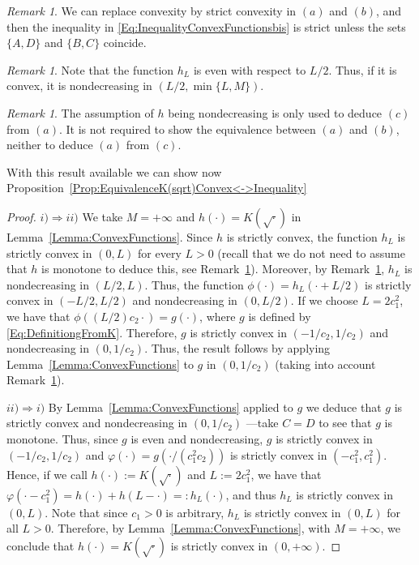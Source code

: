 \documentclass[12pt,reqno]{amsart}
\theoremstyle{definition}
\theoremstyle{remark}
\newtheorem{remark}[theorem]{Remark}
\numberwithin{equation}{section}
\begin{document}
\begin{remark}
	\label{Remark:StrictConvexity}
	We can replace convexity by strict convexity in $(a)$ and $(b)$, and then the inequality in \eqref{Eq:InequalityConvexFunctionsbis} is strict unless the sets $\{A,D\}$ and $\{B,C\}$ coincide.
\end{remark}

\begin{remark}
	\label{Remark:h_Lincreasing}
	Note that the function $h_L$ is even with respect to $L/2$. Thus, if it is convex, it is nondecreasing in $(L/2, \min \{L,M\})$.
\end{remark}

\begin{remark}
	\label{Remark:hypothesisNondecreasing}
	The assumption of $h$ being nondecreasing is only used to deduce $(c)$ from $(a)$. It is not required to show the equivalence between $(a)$ and $(b)$, neither to deduce $(a)$ from $(c)$.
\end{remark}

With this result available we can show now Proposition~\ref{Prop:EquivalenceK(sqrt)Convex<->Inequality}

\begin{proof}
	$i) \Rightarrow ii)$ We take $M = +\infty$ and $h(\cdot) = K(\sqrt{\cdot})$ in Lemma~\ref{Lemma:ConvexFunctions}. Since $h$ is strictly convex, the function $h_L$ is strictly convex in $(0,L)$ for every $L> 0$ (recall that we do not need to assume that $h$ is monotone to deduce this, see Remark~\ref{Remark:hypothesisNondecreasing}). Moreover, by Remark~\ref{Remark:h_Lincreasing}, $h_L$ is nondecreasing in $(L/2,L)$. Thus, the function $\phi(\cdot) = h_L(\cdot + L/2)$ is strictly convex in $(-L/2,L/2)$ and nondecreasing in $(0,L/2)$. If we choose $L=2c_1^2$, we have that $\phi((L/2)c_2 \cdot) = g(\cdot)$, where $g$ is defined by \eqref{Eq:DefinitiongFromK}. Therefore, $g$ is strictly convex in $(-1/c_2, 1/c_2)$ and nondecreasing in $(0,1/c_2)$. Thus, the result follows by applying  Lemma~\ref{Lemma:ConvexFunctions} to $g$ in $(0,1/c_2)$ (taking into account Remark~\ref{Remark:StrictConvexity}).
	
	
	$ii) \Rightarrow i)$ By Lemma~\ref{Lemma:ConvexFunctions} applied to $g$ we deduce that $g$ is strictly convex and nondecreasing in $(0,1/c_2)$ ---take $C=D$ to see that $g$ is monotone. Thus, since $g$ is even and nondecreasing, $g$ is strictly convex in $(-1/c_2,1/c_2)$ and $\varphi(\cdot) = g(\cdot/(c_1^2 c_2))$ is strictly convex in $(-c_1^2, c_1^2)$. Hence, if we call $h(\cdot) := K(\sqrt{\cdot})$ and $L:= 2c_1^2$, we have that $\varphi(\cdot - c_1^2) = h(\cdot) + h(L-\cdot) =:  h_L(\cdot)$, and thus $h_L$ is strictly convex in $(0,L)$. Note that since $c_1>0$ is arbitrary, $h_L$ is strictly convex in $(0,L)$ for all $L>0$. Therefore, by Lemma~\ref{Lemma:ConvexFunctions}, with  $M = +\infty$, we conclude that $h(\cdot) = K(\sqrt{\cdot})$ is strictly convex in $(0,+\infty)$.
\end{proof}
\end{document}
